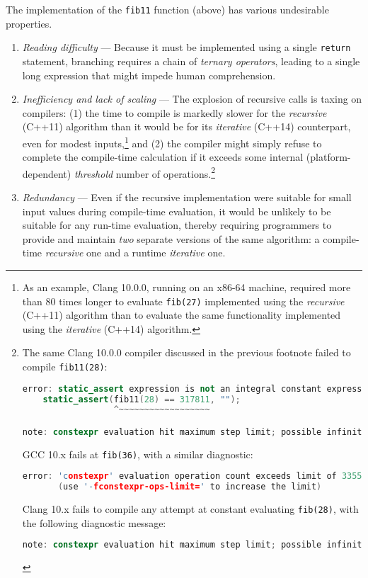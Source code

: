 \noindent The implementation of the \texttt{fib11} function (above) has various
undesirable properties.
\begin{enumerate}
\item{\emph{Reading difficulty} — Because it must be implemented using a single \texttt{return} statement, branching requires a chain of \emph{ternary operators}, leading to a single long expression that might impede human comprehension.}
\item{\emph{Inefficiency and lack of scaling} — The explosion of recursive calls is taxing on compilers: (1) the time to compile is markedly slower for the \emph{recursive} (C++11) algorithm than it would be for its \emph{iterative} (C++14) counterpart, even for modest inputs,{\cprotect\footnote{As an example, Clang 10.0.0, running on an x86-64 machine, required more than 80 times longer to evaluate \texttt{fib(27)} implemented using the \emph{recursive} (C++11) algorithm than to evaluate the same functionality implemented using the \emph{iterative} (C++14) algorithm.}} and (2) the compiler might simply refuse to complete the compile-time calculation if it exceeds some internal (platform-dependent) \emph{threshold} number of operations.{\cprotect\footnote{The same Clang 10.0.0 compiler discussed in the previous footnote failed to compile \texttt{fib11(28)}:

\begin{lstlisting}[language=C++, basicstyle={\ttfamily\footnotesize}]
error: static_assert expression is not an integral constant expression
    static_assert(fib11(28) == 317811, "");
                  ^~~~~~~~~~~~~~~~~~~

note: constexpr evaluation hit maximum step limit; possible infinite loop?
\end{lstlisting}

\noindent GCC 10.x fails at \texttt{fib(36)}, with a similar diagnostic:

\begin{lstlisting}[language=C++, basicstyle={\ttfamily\footnotesize}]
error: 'constexpr' evaluation operation count exceeds limit of 33554432
       (use '-fconstexpr-ops-limit=' to increase the limit)
\end{lstlisting}

\noindent Clang 10.x fails to compile any attempt at constant evaluating \texttt{fib(28)}, with the following diagnostic message:

\begin{lstlisting}[language=C++, basicstyle={\ttfamily\footnotesize}]
note: constexpr evaluation hit maximum step limit; possible infinite loop?
\end{lstlisting} 
}} %
} %
\item{\emph{Redundancy} — Even if the recursive implementation were suitable for small input values during compile-time evaluation, it would be unlikely to be suitable for any run-time evaluation, thereby requiring programmers to provide and maintain \emph{two} separate versions of the same algorithm: a compile-time \emph{recursive} one and a runtime \emph{iterative} one.}
\end{enumerate}

